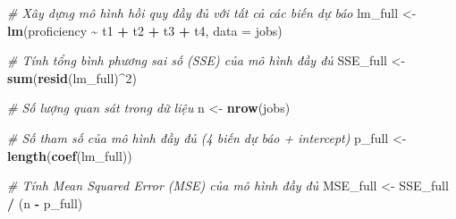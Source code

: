 \documentclass[
]{article}
\newenvironment{Shaded}{\begin{snugshade}}{\end{snugshade}}
\newcommand{\AttributeTok}[1]{\textcolor[rgb]{0.13,0.29,0.53}{#1}}
\newcommand{\CommentTok}[1]{\textcolor[rgb]{0.56,0.35,0.01}{\textit{#1}}}
\newcommand{\DecValTok}[1]{\textcolor[rgb]{0.00,0.00,0.81}{#1}}
\newcommand{\FunctionTok}[1]{\textcolor[rgb]{0.13,0.29,0.53}{\textbf{#1}}}
\newcommand{\NormalTok}[1]{#1}
\newcommand{\OtherTok}[1]{\textcolor[rgb]{0.56,0.35,0.01}{#1}}
\newcommand{\SpecialCharTok}[1]{\textcolor[rgb]{0.81,0.36,0.00}{\textbf{#1}}}
\begin{document}
\begin{Shaded}
\begin{Highlighting}[]
\CommentTok{\# Xây dựng mô hình hồi quy đầy đủ với tất cả các biến dự báo}
\NormalTok{lm\_full }\OtherTok{\textless{}{-}} \FunctionTok{lm}\NormalTok{(proficiency }\SpecialCharTok{\textasciitilde{}}\NormalTok{ t1 }\SpecialCharTok{+}\NormalTok{ t2 }\SpecialCharTok{+}\NormalTok{ t3 }\SpecialCharTok{+}\NormalTok{ t4, }\AttributeTok{data =}\NormalTok{ jobs)}

\CommentTok{\# Tính tổng bình phương sai số (SSE) của mô hình đầy đủ}
\NormalTok{SSE\_full }\OtherTok{\textless{}{-}} \FunctionTok{sum}\NormalTok{(}\FunctionTok{resid}\NormalTok{(lm\_full)}\SpecialCharTok{\^{}}\DecValTok{2}\NormalTok{)}

\CommentTok{\# Số lượng quan sát trong dữ liệu}
\NormalTok{n }\OtherTok{\textless{}{-}} \FunctionTok{nrow}\NormalTok{(jobs)}

\CommentTok{\# Số tham số của mô hình đầy đủ (4 biến dự báo + intercept)}
\NormalTok{p\_full }\OtherTok{\textless{}{-}} \FunctionTok{length}\NormalTok{(}\FunctionTok{coef}\NormalTok{(lm\_full)) }

\CommentTok{\# Tính Mean Squared Error (MSE) của mô hình đầy đủ}
\NormalTok{MSE\_full }\OtherTok{\textless{}{-}}\NormalTok{ SSE\_full }\SpecialCharTok{/}\NormalTok{ (n }\SpecialCharTok{{-}}\NormalTok{ p\_full)}
\end{Highlighting}
\end{Shaded}
\end{document}
